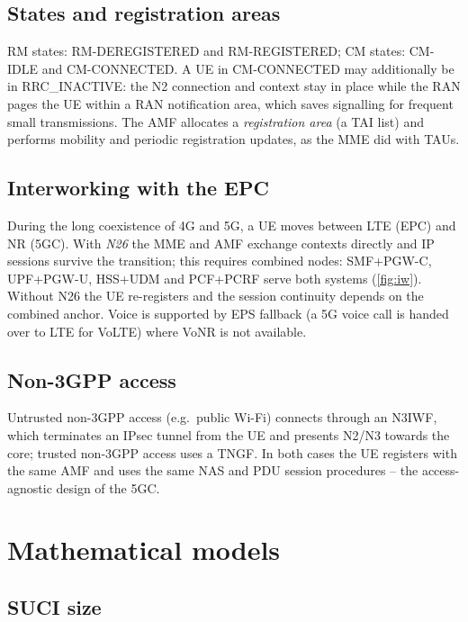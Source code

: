 \documentclass[11pt,a4paper]{article}
\begin{document}
\subsection{States and registration areas}
RM states: RM-DEREGISTERED and RM-REGISTERED; CM states: CM-IDLE and CM-CONNECTED. A UE in CM-CONNECTED may additionally be in
RRC\_INACTIVE: the N2 connection and context stay in place while the RAN pages the UE within a RAN notification area, which
saves signalling for frequent small transmissions. The AMF allocates a \emph{registration area} (a TAI list) and performs
mobility and periodic registration updates, as the MME did with TAUs.

\subsection{Interworking with the EPC}
During the long coexistence of 4G and 5G, a UE moves between LTE (EPC) and NR (5GC). With \emph{N26} the MME and AMF exchange
contexts directly and IP sessions survive the transition; this requires combined nodes: SMF+PGW-C, UPF+PGW-U, HSS+UDM and
PCF+PCRF serve both systems (\cref{fig:iw}). Without N26 the UE re-registers and the session continuity depends on the
combined anchor. Voice is supported by EPS fallback (a 5G voice call is handed over to LTE for VoLTE) where VoNR is not
available.

\begin{acnfigure}
  \caption{EPC--5GC interworking with N26 and combined nodes.}
  \label{fig:iw}
\end{acnfigure}

\subsection{Non-3GPP access}
Untrusted non-3GPP access (e.g.\ public Wi-Fi) connects through an N3IWF, which terminates an IPsec tunnel from the UE and
presents N2/N3 towards the core; trusted non-3GPP access uses a TNGF. In both cases the UE registers with the same AMF and
uses the same NAS and PDU session procedures -- the access-agnostic design of the 5GC.

\section{Mathematical models}

\subsection{SUCI size}\label{sec:suci}
\end{document}

